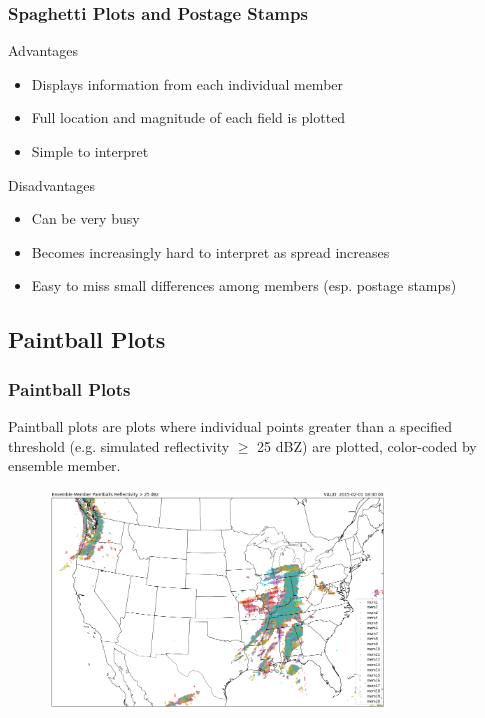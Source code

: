 \documentclass{beamer}
\begin{document}
\begin{frame}
\frametitle{Spaghetti Plots and Postage Stamps}
Advantages
\begin{itemize}
\item Displays information from each individual member
\item Full location and magnitude of each field is plotted
\item Simple to interpret 
\end{itemize}

Disadvantages
\begin{itemize}
  \item Can be very busy
  \item Becomes increasingly hard to interpret as spread increases
  \item Easy to miss small differences among members (esp. postage stamps)
\end{itemize}
\end{frame}

\subsection{Paintball Plots}
\begin{frame}
\frametitle{Paintball Plots}
Paintball plots are plots where individual points greater than a specified threshold (e.g. simulated reflectivity $\geq$ 25 dBZ) are plotted, color-coded by ensemble member.

\begin{figure}
    \includegraphics[width=0.8\textwidth]{paintballs}
\end{figure}
\end{frame}
\end{document}
